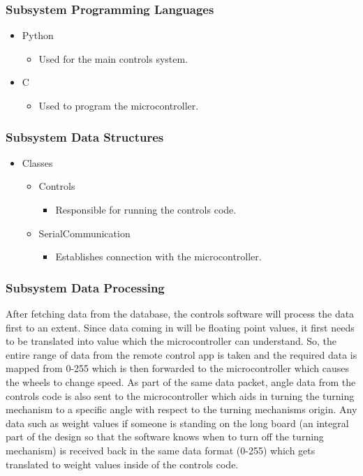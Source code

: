 \subsubsection{Subsystem Programming Languages}
\begin{itemize}
    \item Python
    \begin{itemize}
        \item Used for the main controls system.
    \end{itemize}
    \item C
    \begin{itemize}
        \item Used to program the microcontroller.
    \end{itemize}
\end{itemize}

\subsubsection{Subsystem Data Structures}
\begin{itemize}
    \item Classes
    \begin{itemize}
        \item Controls
        \begin{itemize}
            \item Responsible for running the controls code.
        \end{itemize}
        \item SerialCommunication
        \begin{itemize}
            \item Establishes connection with the microcontroller.
        \end{itemize}
    \end{itemize}
\end{itemize}

\subsubsection{Subsystem Data Processing}
After fetching data from the database, the controls software will process the data first to an extent. Since data coming in will be floating point values, it first needs to be translated into value which the microcontroller can understand. So, the entire range of data from the remote control app is taken and the required data is mapped from 0-255 which is then forwarded to the microcontroller which causes the wheels to change speed. As part of the same data packet, angle data from the controls code is also sent to the microcontroller which aids in turning the turning mechanism to a specific angle with respect to the turning mechanisms origin. Any data such as weight values if someone is standing on the long board (an integral part of the design so that the software knows when to turn off the turning mechanism) is received back in the same data format (0-255) which gets translated to weight values inside of the controls code.